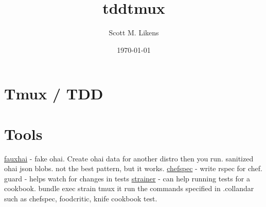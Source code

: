 \documentclass[11pt]{article}
\title{tddtmux}
\author{Scott M. Likens}
\date{\today}
\begin{document}
\maketitle

\setcounter{tocdepth}{3}
\tableofcontents
\vspace*{1cm}
\section{Tmux / TDD}
\label{sec-1}
\section{Tools}
\label{sec-2}

\href{https://github.com/customink/fauxhai}{fauxhai} - fake ohai.  Create ohai data for another distro then you run.
  sanitized ohai json blobs.  not the best pattern, but it works.
\href{https://github.com/acrmp/chefspec}{chefspec} - write rspec for chef.
guard - helps watch for changes in tests
\href{https://github.com/customink/strainer}{strainer} - can help running tests for a cookbook.
  bundle exec strain tmux
    it run the commands specified in .collandar
      such as chefspec, foodcritic, knife cookbook test.
\end{document}

